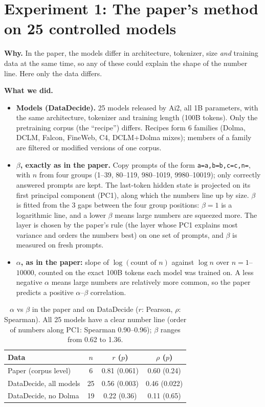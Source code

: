 
\section{Experiment 1: The paper's method on 25 controlled models}

\textbf{Why.} In the paper, the models differ in architecture, tokenizer, size \emph{and} training
data at the same time, so any of these could explain the shape of the number line. Here only the
data differs.

\textbf{What we did.}
\begin{itemize}
\item \textbf{Models (DataDecide).} 25 models released by Ai2, all 1B parameters, with the same
  architecture, tokenizer and training length (100B tokens). Only the pretraining corpus (the
  ``recipe'') differs. Recipes form 6 families (Dolma, DCLM, Falcon, FineWeb, C4, DCLM+Dolma mixes);
  members of a family are filtered or modified versions of one corpus.
\item \textbf{$\beta$, exactly as in the paper.} Copy prompts of the form \texttt{a=a,b=b,c=c,n=}, with $n$ from four
  groups (1--39, 80--119, 980--1019, 9980--10019); only correctly answered prompts are kept. The
  last-token hidden state is projected on its first principal component (PC1), along which the
  numbers line up by size. $\beta$ is fitted from the 3 gaps between the four group positions:
  $\beta = 1$ is a logarithmic line, and a lower $\beta$ means large numbers are squeezed more. The
  layer is chosen by the paper's rule (the layer whose PC1 explains most variance and orders the
  numbers best) on one set of prompts, and $\beta$ is measured on fresh prompts.
\item \textbf{$\alpha$, as in the paper:} slope of $\log(\text{count of } n)$ against $\log n$ over
  $n = 1$--$10000$, counted on the exact 100B tokens each model was trained on. A less negative
  $\alpha$ means large numbers are relatively more common, so the paper predicts a positive
  $\alpha$--$\beta$ correlation.
\end{itemize}

\begin{table}[h]
\centering\small
\begin{tabular}{lccc}
\hline
Data & $n$ & $r$ ($p$) & $\rho$ ($p$) \\
\hline
Paper (corpus level) & 6 & 0.81 (0.061) & 0.60 (0.24) \\
DataDecide, all models & 25 & 0.56 (0.003) & 0.46 (0.022) \\
DataDecide, no Dolma & 19 & 0.22 (0.36) & 0.11 (0.65) \\
\hline
\end{tabular}
\caption{$\alpha$ vs $\beta$ in the paper and on DataDecide ($r$: Pearson, $\rho$: Spearman). All 25 models have a clear number line
(order of numbers along PC1: Spearman 0.90--0.96); $\beta$ ranges from 0.62 to 1.36.}
\label{tab:exp1}
\end{table}

